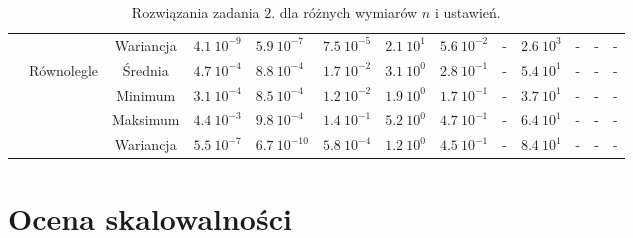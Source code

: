 \documentclass[11pt, a4paper, oneside]{article}
\begin{document}
\begin{table}[h]
\begin{adjustwidth}{0cm}{}
\begin{tabular}{|c|c|c|l|l|l|l|l|c|l|c|c|c|}
                      &                               & Wariancja & $4.1 \ 10^{-9}$          & $5.9 \ 10^{-7}$         & $7.5 \ 10^{-5}$          & $2.1 \ 10^{1}$          & $5.6 \ 10^{-2}$          & -                             & $2.6 \ 10^{3}$           & -                             & -                             & -                             \\ \cline{2-13} 
                      & \multirow{4}{*}{Równolegle}   & Średnia   & $4.7 \ 10^{-4}$          & $8.8 \ 10^{-4}$         & $1.7 \ 10^{-2}$          & $3.1 \ 10^{0}$          & $2.8 \ 10^{-1}$          & -                             & $5.4 \ 10^{1}$           & -                             & -                             & -                             \\ \cline{3-13} 
                      &                               & Minimum   & $3.1 \ 10^{-4}$          & $8.5 \ 10^{-4}$         & $1.2 \ 10^{-2}$          & $1.9 \ 10^{0}$          & $1.7 \ 10^{-1}$          & -                             & $3.7 \ 10^{1}$           & -                             & -                             & -                             \\ \cline{3-13} 
                      &                               & Maksimum  & $4.4 \ 10^{-3}$          & $9.8 \ 10^{-4}$         & $1.4 \ 10^{-1}$          & $5.2 \ 10^{0}$          & $4.7 \ 10^{-1}$          & -                             & $6.4 \ 10^{1}$           & -                             & -                             & -                             \\ \cline{3-13} 
                      &                               & Wariancja & $5.5 \ 10^{-7}$          & $6.7 \ 10^{-10}$        & $5.8 \ 10^{-4}$          & $1.2 \ 10^{0}$          & $4.5 \ 10^{-1}$          & -                             & $8.4 \ 10^{1}$           & -                             & -                             & -                             \\ \hline
\end{tabular}
\end{adjustwidth}
\caption{Rozwiązania zadania $2$. dla różnych wymiarów $n$ i ustawień.}
\label{tab:rozw_zad2}
\end{table}
\renewcommand{\arraystretch}{1}

\section{Ocena skalowalności}
\end{document}
